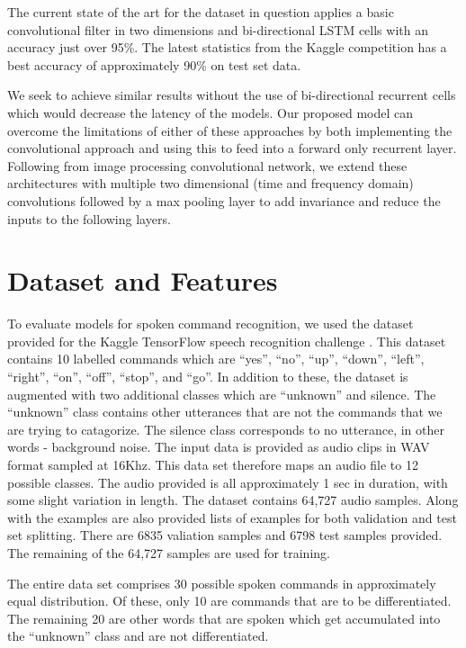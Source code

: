 \documentclass{article}
\begin{document}
The current state of the art for the dataset in question applies a
basic convolutional filter in two dimensions and bi-directional LSTM
cells with an accuracy just over 95\%\cite{zhang2017hello}. The latest
statistics from the
Kaggle competition has a best accuracy of approximately
90\%\cite{kaggle} on test set data.

We seek to achieve similar results without the use
of bi-directional recurrent cells which would decrease the latency of
the models. Our proposed model can overcome the limitations of either
of these approaches by
both implementing the convolutional approach and using this to feed
into a forward only recurrent layer. Following from image processing
convolutional network, we extend these architectures with multiple two
dimensional (time and frequency domain) convolutions followed by a max
pooling layer to add invariance and reduce the inputs to the following
layers.

\section{Dataset and Features}
To evaluate models for spoken command recognition, we used the dataset
provided for the Kaggle TensorFlow speech recognition challenge
\cite{kaggle, speechcommands}. This dataset contains 10 labelled
commands which are ``yes'', ``no'', ``up'', ``down'', ``left'',
``right'', ``on'', ``off'', ``stop'', and ``go''. In addition to
these, the dataset is augmented with two additional classes which are
“unknown” and silence. The “unknown” class contains other utterances
that are not the commands that we are
trying to catagorize. The silence class corresponds to no
utterance, in other words - background noise. The input data is provided as
audio clips in WAV format sampled at 16Khz. This data set therefore
maps an audio file to 12 possible classes. The audio provided is all
approximately 1 sec in duration, with some slight variation in
length. The dataset contains 64,727 audio samples. Along with the examples
are also provided lists of examples for both validation and test set
splitting. There are 6835 valiation samples and 6798 test samples
provided. The remaining of the 64,727 samples are used for training.

The entire data set comprises 30 possible spoken commands in
approximately equal distribution. Of these, only 10 are commands that
are to be differentiated. The remaining 20 are other words that are
spoken which get accumulated into the ``unknown'' class and are not
differentiated.
\end{document}
